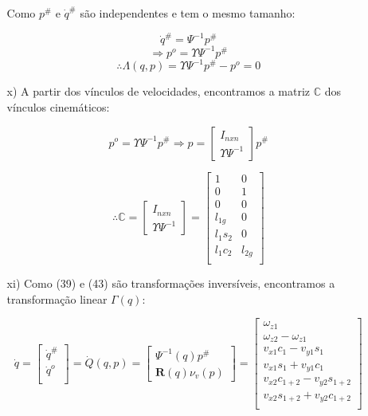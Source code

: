 \documentclass[12pt,a4paper]{article}
\begin{document}
\begin{itemize}
\begin{itemize}
	Como $p^{\#}$ e $\dot{q}^{\#}$ são independentes e tem o mesmo tamanho:

	$$ \dot{q}^{\#} = \Psi^{-1} p^{\#} $$
	$$ \Rightarrow  p^o = \Upsilon \Psi^{-1} p^{\#} $$
	\begin{equation}
	\therefore \Lambda(q,p) =  \Upsilon \Psi^{-1} p^{\#} - p^o  = 0
	\end{equation}
	
	\item[x)] A partir dos vínculos de velocidades, encontramos a matriz $\mathbb{C}$ dos vínculos cinemáticos:
	
	$$ p^o = \Upsilon \Psi^{-1} p^{\#} \Rightarrow p =
	\begin{bmatrix}
	I_{nxn}\\
	\Upsilon \Psi^{-1}
	\end{bmatrix}
	p^{\#}
	$$
	
	\begin{equation}
	\therefore \mathbb{C} =
	\begin{bmatrix}
	I_{nxn}\\
	\Upsilon \Psi^{-1}
	\end{bmatrix}
	=
	\begin{bmatrix}
	1 & 0 \\
	0 & 1 \\
	0 & 0 \\
	l_{1g} & 0\\
	l_1 s_{2} & 0 \\
	l_1 c_{2} & l_{2g} \\
	\end{bmatrix}
	\end{equation}
	
	\item[xi)] Como (39) e (43) são transformações inversíveis, encontramos a transformação linear $\Gamma(q)$:
	
	\begin{equation}
	\dot{q} =
	\begin{bmatrix}
	\dot{q}^{\#} \\
	\dot{q}^o \\
	\end{bmatrix}
	= \dot{Q}(q,p) =
	\begin{bmatrix}
	\Psi^{-1} (q) p^{\#} \\
	\mathbf{R} (q) \nu_v (p)
	\end{bmatrix}
	=
	\begin{bmatrix}
	\omega_{z1} \\
	\omega_{z2}-\omega_{z1}\\
	v_{x1} c_1 - v_{y1} s_1 \\
	v_{x1} s_1 + v_{y1} c_1 \\
	v_{x2} c_{1+2} - v_{y2} s_{1+2} \\
	v_{x2} s_{1+2} + v_{y2} c_{1+2} \\
	\end{bmatrix}
	\end{equation}
	

\end{itemize}
\end{itemize}
\end{document}
